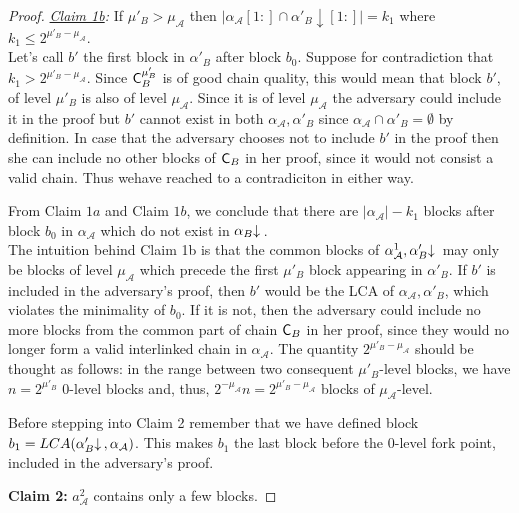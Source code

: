 \begin{proof}
	\noindent
	\textit{\underline{Claim 1b}:} If  $\mu'_B > \mu_\mathcal{A}$ then $\vert \alpha_\mathcal{A}[1:] 
	\cap \alpha'_B\downarrow[1:] \vert = k_1$ where $k_1 \leq 2^{\mu'_B - \mu_\mathcal{A}}$.\\
	Let's call $b'$ the first block in $\alpha'_B$ after block $b_0$.
	Suppose for contradiction that $k_1 > 2^{\mu'_B - \mu_\mathcal{A}}$.  Since $\mathsf{C}_B^{\mu'_B}$ is
	of good chain quality, this would mean that block $b'$, of level $\mu'_B$ is also
	of level $\mu_\mathcal{A}$. Since it is of level $\mu_\mathcal{A}$ the adversary could include it in
	the proof but $b'$ cannot exist in both $\alpha_\mathcal{A}, \alpha'_B$ since $\alpha_\mathcal{A}
	\cap \alpha'_B = \emptyset$ by definition. In case that the adversary chooses not
	to include $b'$ in the proof then she can include no other blocks of $\mathsf{C}_B$ in
	her proof, since it would not consist a valid chain. Thus wehave reached to a contradiciton in either way.

	From Claim $1a$ and Claim $1b$, we conclude that there are $\vert \alpha_\mathcal{A}
	\vert - k_1$ blocks after block $b_0$ in $\alpha_\mathcal{A}$ which do not exist in $\alpha_B\negthickspace\downarrow\,$.\\

	The intuition behind Claim 1b is that the common blocks of $\alpha^1_\mathcal{A}, \alpha'_B\negthickspace\downarrow\,$ may only be blocks of level $\mu_\mathcal{A}$ which precede the first $\mu'_B$ block appearing in $\alpha'_B$. If $b'$ is included in the adversary's proof, then $b'$ would be the LCA of $\alpha_\mathcal{A}, \alpha'_B$, which violates the minimality of $b_0$. If it is not, then the adversary could include no more blocks from the common part of chain $\mathsf{C}_B$ in her proof, since they would no longer form a valid interlinked chain in $\alpha_\mathcal{A}$. The quantity $2^{\mu'_B - \mu_\mathcal{A}}$ should be thought as follows: in the range between two consequent $\mu'_B$-level blocks, we have $n = 2^{\mu'_B}$ 0-level blocks and, thus, $2^{-\mu_\mathcal{A}}n = 2^{\mu'_B - \mu_\mathcal{A}}$ blocks of $\mu_\mathcal{A}$-level. 
	
	Before stepping into Claim 2 remember that we have defined block $b_1 = LCA(\alpha'_B \negthickspace\downarrow\,, \alpha_\mathcal{A})$. This makes $b_1$
	the last block before the 0-level fork point, included in the adversary's proof.

	\noindent
	\textbf{Claim 2:} $a^2_\mathcal{A}$ contains only a few blocks.


\end{proof}
